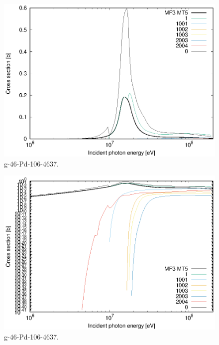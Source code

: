 \begin{figure}
 \includegraphics[width=\linewidth]{eps/g_46-Pd-106_4637.eps}
  \caption{g-46-Pd-106-4637.}
\end{figure}
\begin{figure}
 \includegraphics[width=\linewidth]{eps-log/g_46-Pd-106_4637.eps}
 \caption{g-46-Pd-106-4637.}
\end{figure}
\newpage \clearpage

